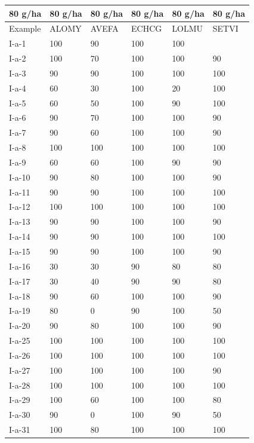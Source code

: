 \documentclass[11pt,a4paper]{article}
\begin{document}
\begin{table}[h]
\begin{tabular}{|l|l|l|l|l|l|}
\hline
80 g/ha & 80 g/ha & 80 g/ha & 80 g/ha & 80 g/ha & 80 g/ha \\ \hline
Example & ALOMY & AVEFA & ECHCG & LOLMU & SETVI \\ \hline
I-a-1 & 100 & 90 & 100 & 100 &  \\ \hline
I-a-2 & 100 & 70 & 100 & 100 & 90 \\ \hline
I-a-3 & 90 & 90 & 100 & 100 & 100 \\ \hline
I-a-4 & 60 & 30 & 100 & 20 & 100 \\ \hline
I-a-5 & 60 & 50 & 100 & 90 & 100 \\ \hline
I-a-6 & 90 & 70 & 100 & 100 & 90 \\ \hline
I-a-7 & 90 & 60 & 100 & 100 & 90 \\ \hline
I-a-8 & 100 & 100 & 100 & 100 & 100 \\ \hline
I-a-9 & 60 & 60 & 100 & 90 & 90 \\ \hline
I-a-10 & 90 & 80 & 100 & 100 & 90 \\ \hline
I-a-11 & 90 & 90 & 100 & 100 & 100 \\ \hline
I-a-12 & 100 & 100 & 100 & 100 & 100 \\ \hline
I-a-13 & 90 & 90 & 100 & 100 & 90 \\ \hline
I-a-14 & 90 & 90 & 100 & 100 & 100 \\ \hline
I-a-15 & 90 & 90 & 100 & 100 & 90 \\ \hline
I-a-16 & 30 & 30 & 90 & 80 & 80 \\ \hline
I-a-17 & 30 & 40 & 90 & 90 & 80 \\ \hline
I-a-18 & 90 & 60 & 100 & 100 & 90 \\ \hline
I-a-19 & 80 & 0 & 90 & 100 & 50 \\ \hline
I-a-20 & 90 & 80 & 100 & 100 & 90 \\ \hline
I-a-25 & 100 & 100 & 100 & 100 & 100 \\ \hline
I-a-26 & 100 & 100 & 100 & 100 & 100 \\ \hline
I-a-27 & 100 & 100 & 100 & 100 & 90 \\ \hline
I-a-28 & 100 & 100 & 100 & 100 & 100 \\ \hline
I-a-29 & 100 & 60 & 100 & 100 & 80 \\ \hline
I-a-30 & 90 & 0 & 100 & 90 & 50 \\ \hline
I-a-31 & 100 & 80 & 100 & 100 & 100 \\ \hline

\end{tabular}
\end{table}
\end{document}
